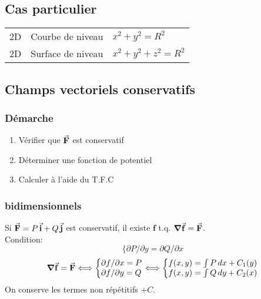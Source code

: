 \subsection{Cas particulier}
\begin{tabular}{lll}
2D & Courbe de niveau & \( x^2+y^2=R^2\) \\
2D & Surface de niveau & \( x^2+y^2+z^2=R^2\)
\end{tabular}

\subsection{Champs vectoriels conservatifs}
\subsubsection{Démarche}
\begin{enumerate}[nosep]
    \item Vérifier que $\va{F}$ est conservatif
    \item Déterminer une fonction de potentiel
    \item Calculer à l'aide du T.F.C
\end{enumerate}

\subsubsection{bidimensionnels}
Si \(\va{F}=P\,\va{i}+Q\,\va{j}\) est conservatif, il existe $\mathbf{f}$ t.q. \(\grad{\va{f}}=\va{F}\).
\\Condition: 
\[ \bigg\{ \partial P/\partial y = \partial Q/\partial x \]
\begin{equation*}
\grad{\va{f}}=\va{F}\Longleftrightarrow 
    \left\{
    \begin{matrix*}[l]
        \partial f/\partial x = P \\
        \partial f/\partial y = Q
    \end{matrix*}
    \right.
    \Longleftrightarrow
    \left\{
    \begin{matrix*}[l]
        f(x,y) = \int P\,dx +C_1(y) \\
        f(x,y) = \int Q\,dy +C_2(x)
    \end{matrix*}
    \right.
\end{equation*}
On conserve les termes non répétitifs $+C$.

